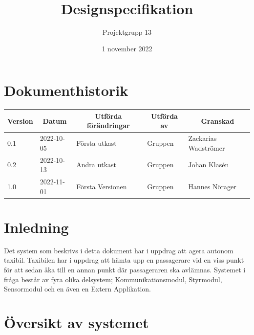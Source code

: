 \documentclass[10pt,oneside,swedish]{lips}
\title{Designspecifikation}
\author{Projektgrupp 13}
\date{1 november 2022}
\begin{document}


\cleardoublepage
\tableofcontents

\cleardoublepage
\section*{Dokumenthistorik}
\begin{tabular}{p{}|p{}|p{}|p{}|p{}} 
  \multicolumn{1}{c}{\bfseries Version} & 
  \multicolumn{1}{|c}{\bfseries Datum} & 
  \multicolumn{1}{|c}{\bfseries Utförda förändringar} & 
  \multicolumn{1}{|c}{\bfseries Utförda av} & 
  \multicolumn{1}{|c}{\bfseries Granskad}\\
  \hline
  \hline
  0.1 & 2022-10-05 & Första utkast & Gruppen & Zackarias Wadströmer   \\
  \hline
  0.2 & 2022-10-13 & Andra utkast & Gruppen & Johan Klasén   \\
  \hline
  1.0 & 2022-11-01 & Första Versionen & Gruppen & Hannes Nörager   \\
  \hline
\end{tabular}

\cleardoublepage
{}\cfoot{\thepage}

\section{Inledning}
Det system som beskrivs i detta dokument har i uppdrag att agera autonom taxibil. Taxibilen har i uppdrag att hämta upp en passagerare vid en viss punkt för att sedan åka till en annan punkt där passageraren ska avlämnas. Systemet i fråga består av fyra olika delsystem; Kommunikationsmodul, Styrmodul, Sensormodul och en även en Extern Applikation.


\section{Översikt av systemet}
\end{document}
